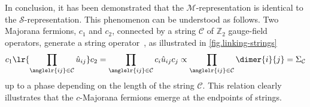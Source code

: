 In conclusion, it has been demonstrated that the $\mathcal{M}$-representation is identical to the $\mathcal{S}$-representation. This phenomenon can be understood as follows. Two Majorana fermions, $c_1$ and $c_2$, connected by a string $\mathcal{C}$ of $\mathbb{Z}_2$ gauge-field operators, generate a string operator~\cite{Kitaev}, as illustrated in \autoref{fig.linking-strings}
\[
c_1\lr{\prod_{\anglelr{ij}\in\mathcal{C}} \hat{u}_{ij}}c_2 = \prod_{\anglelr{ij}\in\mathcal{C}}c_i\hat{u}_{ij}c_j \propto \prod_{\anglelr{ij}\in\mathcal{C}}\dimer{i}{j} = \Sigma_{\mathcal{C}}
\]
up to a phase depending on the length of the string $\mathcal{C}$. This relation clearly illustrates that the $c$-Majorana fermions emerge at the endpoints of strings.



